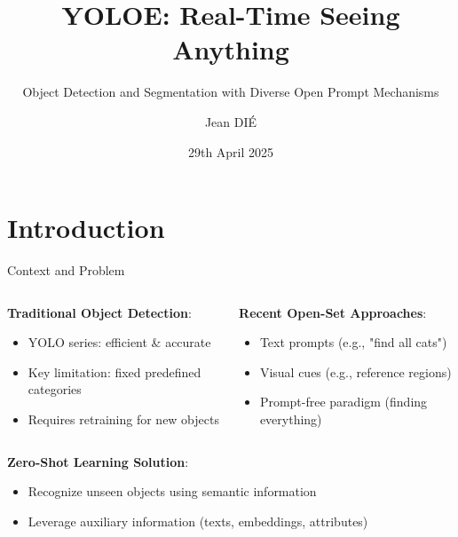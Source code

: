 \documentclass{beamer}
\title{YOLOE: Real-Time Seeing Anything}
\subtitle{Object Detection and Segmentation with Diverse Open Prompt Mechanisms}
\author{Jean DIÉ}
\institute{
    \texttt{[image: assets/ub.png]}\\[1ex]
    University of Barcelona
}
\date{29th April 2025}
\begin{document}
\begin{frame}
    \titlepage
\end{frame}







\section{Introduction}

\begin{frame}{Context and Problem}
    \begin{columns}[T]
        \begin{column}{0.48\textwidth}
            \textbf{Traditional Object Detection}:
            \begin{itemize}
                \item YOLO series: efficient \& accurate
                \item \textcolor{ubburgundy}{Key limitation}: fixed predefined categories
                \item Requires retraining for new objects
            \end{itemize}
        \end{column}
        
        \begin{column}{0.48\textwidth}
            \textbf{Recent Open-Set Approaches}:
            \begin{itemize}
                \item Text prompts (e.g., "find all cats")
                \item Visual cues (e.g., reference regions)
                \item Prompt-free paradigm (finding everything)
            \end{itemize}
        \end{column}
    \end{columns}
    
    \vspace{0.5cm}
    
    \begin{columns}[T]
        \begin{column}{0.48\textwidth}
            \textbf{Zero-Shot Learning Solution}:
            \begin{itemize}
                \item Recognize unseen objects using semantic information
                \item Leverage auxiliary information (texts, embeddings, attributes)
            \end{itemize}
        \end{column}
        

\end{columns}
\end{frame}
\end{document}

